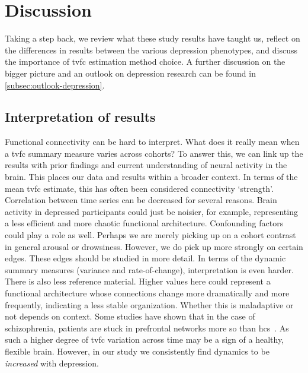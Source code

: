 \clearpage
\section{Discussion}\label{sec:ukb-discussion}

Taking a step back, we review what these study results have taught us, reflect on the differences in results between the various depression phenotypes, and discuss the importance of \gls{tvfc} estimation method choice.
A further discussion on the bigger picture and an outlook on depression research can be found in \cref{subsec:outlook-depression}.

\subsection{Interpretation of results}

Functional connectivity can be hard to interpret.
What does it really mean when a \gls{tvfc} summary measure varies across cohorts?
To answer this, we can link up the results with prior findings and current understanding of neural activity in the brain.
This places our data and results within a broader context.
%
In terms of the mean \gls{tvfc} estimate, this has often been considered connectivity `strength'.
Correlation between time series can be decreased for several reasons.
Brain activity in depressed participants could just be noisier, for example, representing a less efficient and more chaotic functional architecture.
Confounding factors could play a role as well.
Perhaps we are merely picking up on a cohort contrast in general arousal or drowsiness.
However, we do pick up more strongly on certain edges.
These edges should be studied in more detail.
%
In terms of the dynamic summary measures (variance and rate-of-change), interpretation is even harder.
There is also less reference material.
Higher values here could represent a functional architecture whose connections change more dramatically and more frequently, indicating a less stable organization.
Whether this is maladaptive or not depends on context.
Some studies have shown that in the case of schizophrenia, patients are stuck in prefrontal networks more so than \glspl{hc}~\parencite{Damaraju2014}.
As such a higher degree of \gls{tvfc} variation across time may be a sign of a healthy, flexible brain.
However, in our study we consistently find dynamics to be \emph{increased} with depression.

